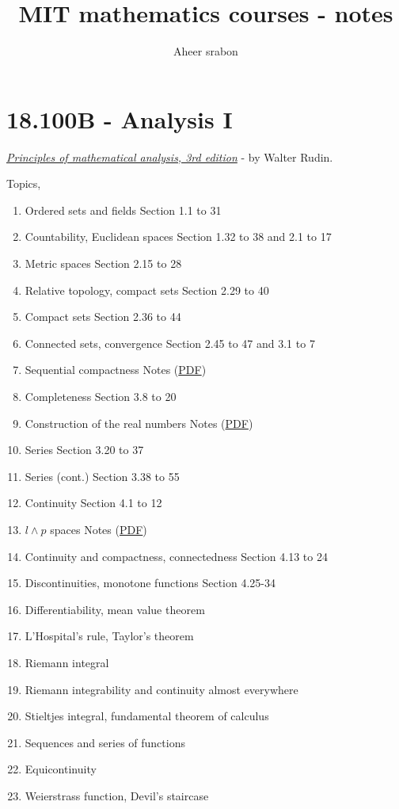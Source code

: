 

\title{MIT mathematics courses - notes}
\author{Aheer srabon}
\date{}


\maketitle

\section{18.100B - Analysis I}
\noindent \href{run:../assets/18.100B/Walter Rudin - Principles of Mathematical Analysis, Third Edition-McGraw-Hill Science Engineering Math (1976).pdf}{\emph{Principles of mathematical analysis, 3rd edition}} - by Walter Rudin.

\vspace{0.5cm}

\noindent Topics,
\begin{enumerate}
	\item Ordered sets and fields  \hfill  Section 1.1 to 31
	\item Countability, Euclidean spaces  \hfill Section 1.32 to 38 and 2.1 to 17
	\item Metric spaces  \hfill Section 2.15 to 28
	\item Relative topology, compact sets  \hfill  Section 2.29 to 40
	\item Compact sets  \hfill Section 2.36 to 44
	\item Connected sets, convergence  \hfill Section 2.45 to 47 and 3.1 to 7
	\item Sequential compactness  \hfill Notes (\href{../assets/18.100B/MIT18_100BF10_compactness.pdf}{PDF})
	\item Completeness \hfill Section 3.8 to 20
	\item Construction of the real numbers \hfill Notes (\href{../assets/18.100B/MIT18_100BF10_Const_of_R.pdf}{PDF})
	\item Series \hfill Section 3.20 to 37
	\item Series (cont.) \hfill Section 3.38 to 55
	\item Continuity \hfill Section 4.1 to 12
	\item $ l \wedge p $ spaces \hfill Notes (\href{../assets/18.100B/MIT18_100BF10_LpCompletens.pdf}{PDF})
	\item Continuity and compactness, connectedness \hfill Section 4.13 to 24
	\item Discontinuities, monotone functions \hfill Section 4.25-34
	\item Differentiability, mean value theorem
	\item L'Hospital's rule, Taylor's theorem
	\item Riemann integral
	\item Riemann integrability and continuity almost everywhere
	\item Stieltjes integral, fundamental theorem of calculus
	\item Sequences and series of functions
	\item Equicontinuity
	\item Weierstrass function, Devil's staircase
\end{enumerate}


